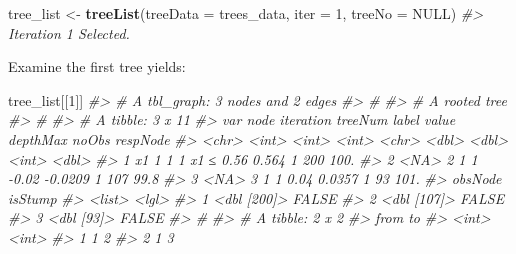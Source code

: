 \documentclass[
]{article}
\newenvironment{Shaded}{\begin{snugshade}}{\end{snugshade}}
\newcommand{\AttributeTok}[1]{\textcolor[rgb]{0.13,0.29,0.53}{#1}}
\newcommand{\CommentTok}[1]{\textcolor[rgb]{0.56,0.35,0.01}{\textit{#1}}}
\newcommand{\ConstantTok}[1]{\textcolor[rgb]{0.56,0.35,0.01}{#1}}
\newcommand{\DecValTok}[1]{\textcolor[rgb]{0.00,0.00,0.81}{#1}}
\newcommand{\FunctionTok}[1]{\textcolor[rgb]{0.13,0.29,0.53}{\textbf{#1}}}
\newcommand{\NormalTok}[1]{#1}
\newcommand{\OtherTok}[1]{\textcolor[rgb]{0.56,0.35,0.01}{#1}}
\begin{document}
\begin{Shaded}
\begin{Highlighting}[]
\NormalTok{tree\_list }\OtherTok{\textless{}{-}} \FunctionTok{treeList}\NormalTok{(}\AttributeTok{treeData =}\NormalTok{ trees\_data, }\AttributeTok{iter =} \DecValTok{1}\NormalTok{, }\AttributeTok{treeNo =} \ConstantTok{NULL}\NormalTok{)}
\CommentTok{\#\textgreater{} Iteration 1 Selected.}
\end{Highlighting}
\end{Shaded}

Examine the first tree yields:

\begin{Shaded}
\begin{Highlighting}[]
\NormalTok{tree\_list[[}\DecValTok{1}\NormalTok{]]}
\CommentTok{\#\textgreater{} \# A tbl\_graph: 3 nodes and 2 edges}
\CommentTok{\#\textgreater{} \#}
\CommentTok{\#\textgreater{} \# A rooted tree}
\CommentTok{\#\textgreater{} \#}
\CommentTok{\#\textgreater{} \# A tibble: 3 x 11}
\CommentTok{\#\textgreater{}   var    node iteration treeNum label         value depthMax noObs respNode}
\CommentTok{\#\textgreater{}   \textless{}chr\textgreater{} \textless{}int\textgreater{}     \textless{}int\textgreater{}   \textless{}int\textgreater{} \textless{}chr\textgreater{}         \textless{}dbl\textgreater{}    \textless{}dbl\textgreater{} \textless{}int\textgreater{}    \textless{}dbl\textgreater{}}
\CommentTok{\#\textgreater{} 1 x1        1         1       1 x1  ≤  0.56  0.564         1   200    100. }
\CommentTok{\#\textgreater{} 2 \textless{}NA\textgreater{}      2         1       1 {-}0.02       {-}0.0209        1   107     99.8}
\CommentTok{\#\textgreater{} 3 \textless{}NA\textgreater{}      3         1       1 0.04         0.0357        1    93    101. }
\CommentTok{\#\textgreater{}   obsNode     isStump}
\CommentTok{\#\textgreater{}   \textless{}list\textgreater{}      \textless{}lgl\textgreater{}  }
\CommentTok{\#\textgreater{} 1 \textless{}dbl [200]\textgreater{} FALSE  }
\CommentTok{\#\textgreater{} 2 \textless{}dbl [107]\textgreater{} FALSE  }
\CommentTok{\#\textgreater{} 3 \textless{}dbl [93]\textgreater{}  FALSE  }
\CommentTok{\#\textgreater{} \#}
\CommentTok{\#\textgreater{} \# A tibble: 2 x 2}
\CommentTok{\#\textgreater{}    from    to}
\CommentTok{\#\textgreater{}   \textless{}int\textgreater{} \textless{}int\textgreater{}}
\CommentTok{\#\textgreater{} 1     1     2}
\CommentTok{\#\textgreater{} 2     1     3}
\end{Highlighting}
\end{Shaded}
\end{document}
